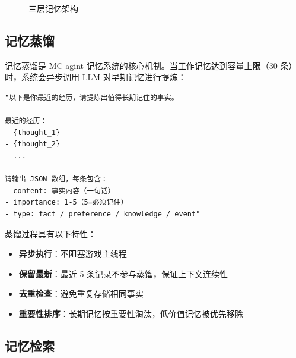 \documentclass[12pt,a4paper]{article}
\begin{document}
\begin{figure}[H]
    \centering
    \caption{三层记忆架构}
    \label{fig:memory}
\end{figure}

\subsection{记忆蒸馏}

记忆蒸馏是 MC-agint 记忆系统的核心机制。当工作记忆达到容量上限（30 条）时，系统会异步调用 LLM 对早期记忆进行提炼：

\begin{lstlisting}[caption={蒸馏 Prompt},label={lst:distill_prompt}]
"以下是你最近的经历，请提炼出值得长期记住的事实。

最近的经历：
- {thought_1}
- {thought_2}
- ...

请输出 JSON 数组，每条包含：
- content: 事实内容（一句话）
- importance: 1-5（5=必须记住）
- type: fact / preference / knowledge / event"
\end{lstlisting}

蒸馏过程具有以下特性：

\begin{itemize}
    \item \textbf{异步执行}：不阻塞游戏主线程
    \item \textbf{保留最新}：最近 5 条记录不参与蒸馏，保证上下文连续性
    \item \textbf{去重检查}：避免重复存储相同事实
    \item \textbf{重要性排序}：长期记忆按重要性淘汰，低价值记忆被优先移除
\end{itemize}

\subsection{记忆检索}
\end{document}
